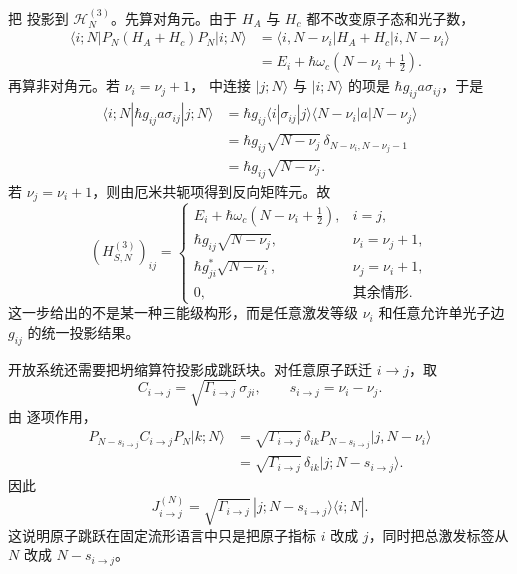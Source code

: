 把 投影到 $\mathcal H_N^{(3)}$。先算对角元。由于 $H_A$ 与 $H_c$ 都不改变原子态和光子数，
\begin{align}
\langle i;N|P_N(H_A+H_c)P_N|i;N\rangle
&=\langle i,N-\nu_i|H_A+H_c|i,N-\nu_i\rangle\\
&=E_i+\hbar\omega_c\left(N-\nu_i+\frac12\right).
\end{align}
再算非对角元。若 $\nu_i=\nu_j+1$， 中连接 $|j;N\rangle$ 与 $|i;N\rangle$ 的项是 $\hbar g_{ij}a\sigma_{ij}$，于是
\begin{align}
\langle i;N|\hbar g_{ij}a\sigma_{ij}|j;N\rangle
&=\hbar g_{ij}
\langle i|\sigma_{ij}|j\rangle
\langle N-\nu_i|a|N-\nu_j\rangle\\
&=\hbar g_{ij}
\sqrt{N-\nu_j}\,
\delta_{N-\nu_i,N-\nu_j-1}\\
&=\hbar g_{ij}\sqrt{N-\nu_j}.
\end{align}
若 $\nu_j=\nu_i+1$，则由厄米共轭项得到反向矩阵元。故
\begin{equation}
(H_{S,N}^{(3)})_{ij}=
\begin{cases}
E_i+\hbar\omega_c(N-\nu_i+\frac12),&i=j,\\
\hbar g_{ij}\sqrt{N-\nu_j},&\nu_i=\nu_j+1,\\
\hbar g_{ji}^*\sqrt{N-\nu_i},&\nu_j=\nu_i+1,\\
0,&\text{其余情形}.
\end{cases}
\label{eq:phys-oqs-hn3-elements}
\end{equation}
这一步给出的不是某一种三能级构形，而是任意激发等级 $\nu_i$ 和任意允许单光子边 $g_{ij}$ 的统一投影结果。

开放系统还需要把坍缩算符投影成跳跃块。对任意原子跃迁 $i\to j$，取
\[
C_{i\to j}=\sqrt{\Gamma_{i\to j}}\,\sigma_{ji},
\qquad
s_{i\to j}=\nu_i-\nu_j.
\]
由 逐项作用，
\begin{align}
P_{N-s_{i\to j}}C_{i\to j}P_N|k;N\rangle
&=\sqrt{\Gamma_{i\to j}}\,\delta_{ik}
P_{N-s_{i\to j}}|j,N-\nu_i\rangle\\
&=\sqrt{\Gamma_{i\to j}}\,\delta_{ik}|j;N-s_{i\to j}\rangle.
\end{align}
因此
\begin{equation}
J_{i\to j}^{(N)}
=\sqrt{\Gamma_{i\to j}}\,
|j;N-s_{i\to j}\rangle\langle i;N|.
\label{eq:phys-oqs-three-atomic-jump}
\end{equation}
这说明原子跳跃在固定流形语言中只是把原子指标 $i$ 改成 $j$，同时把总激发标签从 $N$ 改成 $N-s_{i\to j}$。

